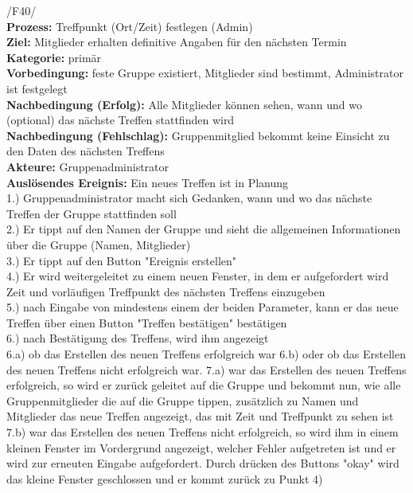 /F40/ \\
\textbf{Prozess:} Treffpunkt (Ort/Zeit) festlegen (Admin)\\
\textbf{Ziel:} Mitglieder erhalten definitive Angaben für den nächsten Termin\\
\textbf{Kategorie:} primär\\
\textbf{Vorbedingung:} feste Gruppe existiert, Mitglieder sind bestimmt, Administrator ist festgelegt\\
\textbf{Nachbedingung (Erfolg):} Alle Mitglieder können sehen, wann und wo (optional) das nächste Treffen stattfinden wird\\
\textbf{Nachbedingung (Fehlschlag):} Gruppenmitglied bekommt keine Einsicht zu den Daten des nächsten Treffens\\
\textbf{Akteure:} Gruppenadministrator\\
\textbf{Auslösendes Ereignis:} Ein neues Treffen ist in Planung\\
1.) Gruppenadministrator macht sich Gedanken, wann und wo das nächste Treffen der Gruppe stattfinden soll\\
2.) Er tippt auf den Namen der Gruppe und sieht die allgemeinen Informationen über die Gruppe (Namen, Mitglieder)\\
3.) Er tippt auf den Button "Ereignis erstellen"\\
4.) Er wird weitergeleitet zu einem neuen Fenster, in dem er aufgefordert wird Zeit und vorläufigen Treffpunkt des nächsten Treffens einzugeben\\
5.) nach Eingabe von mindestens einem der beiden Parameter, kann er das neue Treffen über einen Button "Treffen bestätigen" bestätigen\\
6.) nach Bestätigung des Treffens, wird ihm angezeigt\\
6.a) ob das Erstellen des neuen Treffens erfolgreich war
6.b) oder ob das Erstellen des neuen Treffens nicht erfolgreich war.
7.a) war das Erstellen des neuen Treffens erfolgreich, so wird er zurück geleitet auf die Gruppe und bekommt nun, wie alle Gruppenmitglieder die auf die Gruppe tippen, zusätzlich zu Namen und Mitglieder das neue Treffen angezeigt, das mit Zeit und Treffpunkt zu sehen ist\\
7.b) war das Erstellen des neuen Treffens nicht erfolgreich, so wird ihm in einem kleinen Fenster im Vordergrund angezeigt, welcher Fehler aufgetreten ist und er wird zur erneuten Eingabe aufgefordert. Durch drücken des Buttons "okay" wird das kleine Fenster geschlossen und er kommt zurück zu Punkt 4)\\ \\

